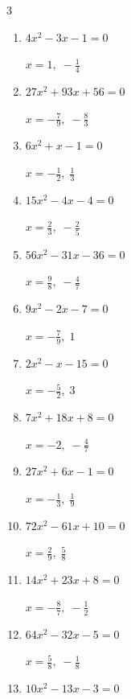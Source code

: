 \begin{multicols}{3}
\begin{enumerate}
        $\displaystyle x=-\frac{4}{5},\; 1$

  \item $4x^{2}-3x-1=0$

        $\displaystyle x=1,\; -\frac{1}{4}$

  \item $27x^{2}+93x+56=0$

        $\displaystyle x=-\frac{7}{9},\; -\frac{8}{3}$

  \item $6x^{2}+x-1=0$

        $\displaystyle x=-\frac{1}{2},\; \frac{1}{3}$

  \item $15x^{2}-4x-4=0$

        $\displaystyle x=\frac{2}{3},\; -\frac{2}{5}$

  \item $56x^{2}-31x-36=0$

        $\displaystyle x=\frac{9}{8},\; -\frac{4}{7}$

  \item $9x^{2}-2x-7=0$

        $\displaystyle x=-\frac{7}{9},\; 1$

\columnbreak %

\resetques

  \item $2x^{2}-x-15=0$

        $\displaystyle x=-\frac{5}{2},\; 3$

  \item $7x^{2}+18x+8=0$

        $\displaystyle x=-2,\; -\frac{4}{7}$

  \item $27x^{2}+6x-1=0$

        $\displaystyle x=-\frac{1}{3},\; \frac{1}{9}$

  \item $72x^{2}-61x+10=0$

        $\displaystyle x=\frac{2}{9},\; \frac{5}{8}$

  \item $14x^{2}+23x+8=0$

        $\displaystyle x=-\frac{8}{7},\; -\frac{1}{2}$

  \item $64x^{2}-32x-5=0$

        $\displaystyle x=\frac{5}{8},\; -\frac{1}{8}$

  \item $10x^{2}-13x-3=0$


\end{enumerate}
\end{multicols}
